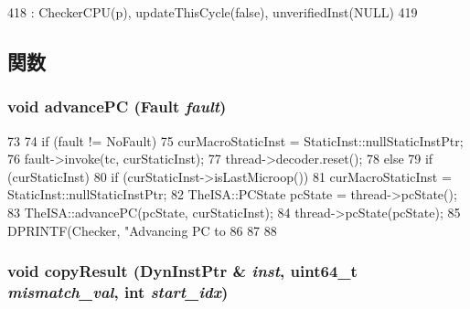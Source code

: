 \begin{DoxyCode}
418         : CheckerCPU(p), updateThisCycle(false), unverifiedInst(NULL)
419     { }
\end{DoxyCode}


\subsection{関数}
\hypertarget{classChecker_a9ff8fd374877c2ff6c10178aaad00852}{
\subsubsection[{advancePC}]{\setlength{\rightskip}{0pt plus 5cm}void advancePC ({\bf Fault} {\em fault})}}
\label{classChecker_a9ff8fd374877c2ff6c10178aaad00852}



\begin{DoxyCode}
73 {
74     if (fault != NoFault) {
75         curMacroStaticInst = StaticInst::nullStaticInstPtr;
76         fault->invoke(tc, curStaticInst);
77         thread->decoder.reset();
78     } else {
79         if (curStaticInst) {
80             if (curStaticInst->isLastMicroop())
81                 curMacroStaticInst = StaticInst::nullStaticInstPtr;
82             TheISA::PCState pcState = thread->pcState();
83             TheISA::advancePC(pcState, curStaticInst);
84             thread->pcState(pcState);
85             DPRINTF(Checker, "Advancing PC to %
86         }
87     }
88 }
\end{DoxyCode}
\hypertarget{classChecker_afa9c0925515db4634c3902c386239f3c}{
\subsubsection[{copyResult}]{\setlength{\rightskip}{0pt plus 5cm}void copyResult ({\bf DynInstPtr} \& {\em inst}, \/  uint64\_\-t {\em mismatch\_\-val}, \/  int {\em start\_\-idx})}}
\label{classChecker_afa9c0925515db4634c3902c386239f3c}




